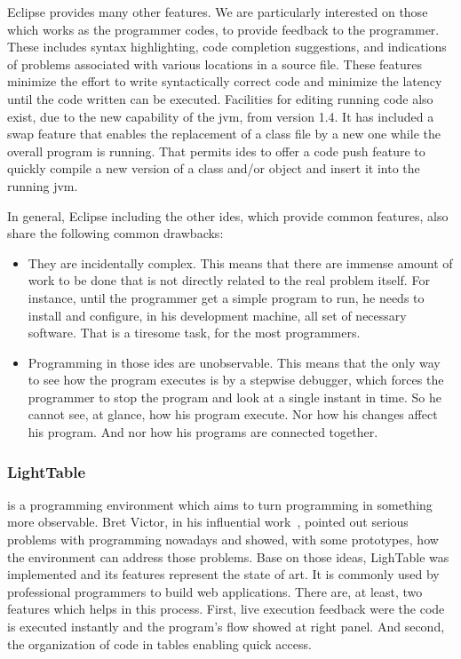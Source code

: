 Eclipse provides many other features. We are particularly interested on those which works as the programmer codes, to provide feedback to the programmer. These includes syntax highlighting, code completion suggestions, and indications of problems associated with various locations in a source file. These features minimize the effort to write syntactically correct code and minimize the latency until the code written can be executed. Facilities for editing running code also exist, due to the new capability of the \ac{jvm}, from version 1.4. It has included a swap feature that enables the replacement of a class file by a new one while the overall program is running. That permits \ac{ide}s to offer a code push feature to quickly compile a new version of a class and/or object and insert it into the running \ac{jvm}.

In general, Eclipse including the other \ac{ide}s, which provide common features, also share the following common drawbacks:
\begin{itemize}
	\item They are incidentally complex. This means that there are immense amount of work to be done that is not directly related to the real problem itself. For instance, until the programmer get a simple program to run, he needs to install and configure, in his development machine, all set of necessary software. That is a tiresome task, for the most programmers.
	\item Programming in those \ac{ide}s are unobservable. This means that the only way to see how the program executes is by a stepwise debugger, which forces the programmer to stop the program and look at a single instant in time. So he cannot see, at glance, how his program execute. Nor how his changes affect his program. And nor how his programs are connected together.
\end{itemize}
\subsubsection{LightTable\protect\footnotemark[\ref{lt:note}]} is a programming environment which aims to turn programming in something more observable. Bret Victor, in his influential work~\cite{inventingPrin,learnableProg}, pointed out serious problems with programming nowadays and showed, with some prototypes, how the environment can address those problems. Base on those ideas, LighTable was implemented and its features represent the state of art. It is commonly used by professional programmers to build web applications. There are, at least, two features which helps in this process. First, live execution feedback were the code is executed instantly and the program's flow showed at right panel. And second, the organization of code in tables enabling quick access.

